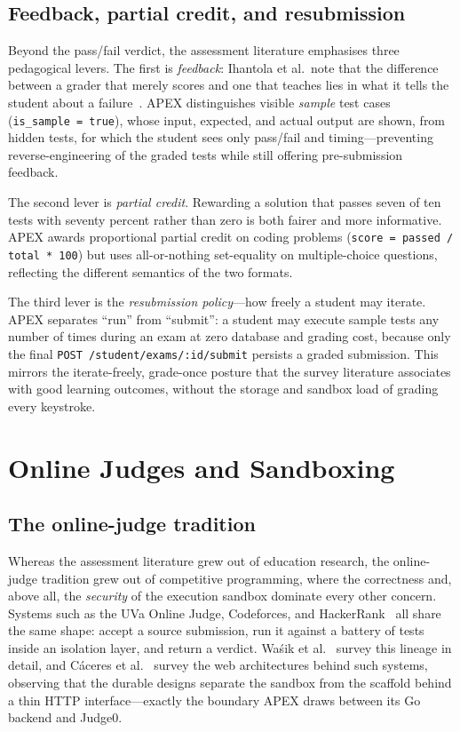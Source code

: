 \subsection{Feedback, partial credit, and resubmission}

Beyond the pass/fail verdict, the assessment literature emphasises three pedagogical
levers. The first is \emph{feedback}: Ihantola et al.\ note that the difference between a
grader that merely scores and one that teaches lies in what it tells the student about a
failure~\cite{ihantola2010autograding}. APEX distinguishes visible \emph{sample} test cases
(\texttt{is\_sample = true}), whose input, expected, and actual output are shown, from
hidden tests, for which the student sees only pass/fail and timing---preventing
reverse-engineering of the graded tests while still offering pre-submission feedback.

The second lever is \emph{partial credit}. Rewarding a solution that passes seven of ten
tests with seventy percent rather than zero is both fairer and more informative. APEX awards
proportional partial credit on coding problems (\texttt{score = passed / total * 100}) but
uses all-or-nothing set-equality on multiple-choice questions, reflecting the different
semantics of the two formats.

The third lever is the \emph{resubmission policy}---how freely a student may iterate.
APEX separates ``run'' from ``submit'': a student may execute sample tests any number of
times during an exam at zero database and grading cost, because only the final
\texttt{POST /student/exams/:id/submit} persists a graded submission. This mirrors the
iterate-freely, grade-once posture that the survey literature associates with good learning
outcomes, without the storage and sandbox load of grading every keystroke.

\section{Online Judges and Sandboxing}\label{sec:bg-judges}

\subsection{The online-judge tradition}

Whereas the assessment literature grew out of education research, the online-judge
tradition grew out of competitive programming, where the correctness and, above all, the
\emph{security} of the execution sandbox dominate every other concern. Systems such as the
UVa Online Judge, Codeforces, and HackerRank~\cite{hackerrank} all share the same shape:
accept a source submission, run it against a battery of tests inside an isolation layer,
and return a verdict. Wa\'{s}ik et al.~\cite{wasik2018survey} survey this lineage in detail,
and C\'{a}ceres et al.~\cite{caceres2014online} survey the web architectures behind such
systems, observing that the durable designs separate the sandbox from the scaffold behind a
thin HTTP interface---exactly the boundary APEX draws between its Go backend and Judge0.

